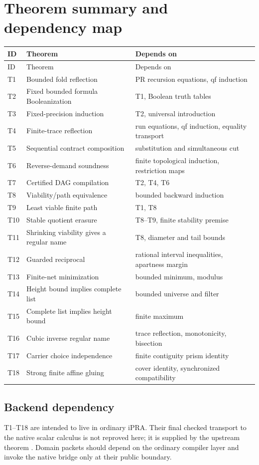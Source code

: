 \section{Theorem summary and dependency map}

\begin{longtable}{p{}p{}p{}}
\toprule
ID & Theorem & Depends on \\
\midrule
\endfirsthead
\toprule
ID & Theorem & Depends on \\
\midrule
\endhead
T1 & Bounded fold reflection & PR recursion equations, qf induction \\
T2 & Fixed bounded formula Booleanization & T1, Boolean truth tables \\
T3 & Fixed-precision induction & T2, universal introduction \\
T4 & Finite-trace reflection & run equations, qf induction, equality transport \\
T5 & Sequential contract composition & substitution and simultaneous cut \\
T6 & Reverse-demand soundness & finite topological induction, restriction maps \\
T7 & Certified DAG compilation & T2, T4, T6 \\
T8 & Viability/path equivalence & bounded backward induction \\
T9 & Least viable finite path & T1, T8 \\
T10 & Stable quotient erasure & T8--T9, finite stability premise \\
T11 & Shrinking viability gives a regular name & T8, diameter and tail bounds \\
T12 & Guarded reciprocal & rational interval inequalities, apartness margin \\
T13 & Finite-net minimization & bounded minimum, modulus \\
T14 & Height bound implies complete list & bounded universe and filter \\
T15 & Complete list implies height bound & finite maximum \\
T16 & Cubic inverse regular name & trace reflection, monotonicity, bisection \\
T17 & Carrier choice independence & finite contiguity prism identity \\
T18 & Strong finite affine gluing & cover identity, synchronized compatibility \\
\bottomrule
\end{longtable}

\subsection{Backend dependency}

T1--T18 are intended to live in ordinary iPRA.  Their final checked transport
to the native scalar calculus is not reproved here; it is supplied by the
upstream theorem .  Domain packets should depend on the
ordinary compiler layer and invoke the native bridge only at their public
boundary.
